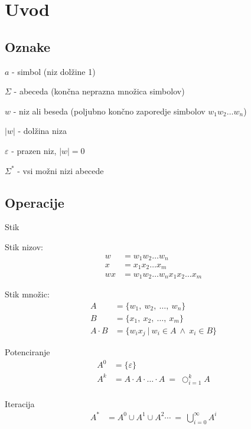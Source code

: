 \documentclass[10pt,a4paper,oneside]{book}
\begin{document}
\section{Uvod}
\subsection*{Oznake}
\begin{items}
\item $a$ - simbol (niz dolžine 1)
\item $\Sigma$ - abeceda (končna neprazna množica simbolov)
\item $w$ - niz ali beseda (poljubno končno zaporedje  simbolov $w_1w_2 \ldots w_n$)
\item $|w|$ - dolžina niza
\item $\varepsilon$ - prazen niz, $|w|=0$
\item $\Sigma^*$ - vsi možni nizi abecede
\end{items}

\subsection*{Operacije}
\begin{items}
\item Stik
	\begin{items}
	\item Stik nizov:
		\begin{align*}
		w  &= w_1 w_2 \dots w_n\\
		x  &= x_1 x_2 \dots x_m\\
		wx &= w_1 w_2 \dots w_n x_1 x_2 \dots x_m
		\end{align*}
	\item Stik množic:
		\begin{align*} 
		A & = \lbrace w_1 ,\ w_2 ,\ \dots ,\ w_n \rbrace \\ 
		B & = \lbrace x_1 ,\ x_2 ,\ \dots ,\ x_m \rbrace \\ 
		A \cdot B & = \lbrace w_ix_j \ | \ w_i \in A \ \wedge \ x_i \in B \rbrace
		\end{align*} 
	\end{items}
\item Potenciranje
	\begin{align*} 
	A^0 & = \lbrace \varepsilon \rbrace \\
	A^k & = A \cdot A \cdot \ldots \cdot A \ = \ \bigcirc_{i=1}^{k} A \\
	\end{align*}
\item Iteracija
	\begin{align*} 
	A^* &= A^0 \cup A^1 \cup A^2 \cdots  \ = \ \bigcup_{i=0}^{ \infty } A^i
	\end{align*} 		
\end{items}
\end{document}

